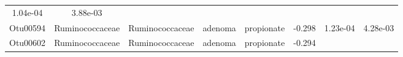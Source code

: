 \documentclass[11pt,]{article}
\begin{document}
\begin{longtable}[]{@{}cccccccc@{}}
\begin{minipage}[t]{0.08\columnwidth}
1.04e-04\strut
\end{minipage} & \begin{minipage}[t]{0.08\columnwidth}\centering\strut
3.88e-03\strut
\end{minipage}\tabularnewline
\begin{minipage}[t]{0.08\columnwidth}\centering\strut
Otu00594\strut
\end{minipage} & \begin{minipage}[t]{0.15\columnwidth}\centering\strut
Ruminococcaceae\strut
\end{minipage} & \begin{minipage}[t]{0.15\columnwidth}\centering\strut
Ruminococcaceae\strut
\end{minipage} & \begin{minipage}[t]{0.08\columnwidth}\centering\strut
adenoma\strut
\end{minipage} & \begin{minipage}[t]{0.09\columnwidth}\centering\strut
propionate\strut
\end{minipage} & \begin{minipage}[t]{0.07\columnwidth}\centering\strut
-0.298\strut
\end{minipage} & \begin{minipage}[t]{0.08\columnwidth}\centering\strut
1.23e-04\strut
\end{minipage} & \begin{minipage}[t]{0.08\columnwidth}\centering\strut
4.28e-03\strut
\end{minipage}\tabularnewline
\begin{minipage}[t]{0.08\columnwidth}\centering\strut
Otu00602\strut
\end{minipage} & \begin{minipage}[t]{0.15\columnwidth}\centering\strut
Ruminococcaceae\strut
\end{minipage} & \begin{minipage}[t]{0.15\columnwidth}\centering\strut
Ruminococcaceae\strut
\end{minipage} & \begin{minipage}[t]{0.08\columnwidth}\centering\strut
adenoma\strut
\end{minipage} & \begin{minipage}[t]{0.09\columnwidth}\centering\strut
propionate\strut
\end{minipage} & \begin{minipage}[t]{0.07\columnwidth}\centering\strut
-0.294\strut
\end{minipage} & \begin{minipage}[t]{0.08\columnwidth}\centering\strut

\end{minipage}
\end{longtable}
\end{document}
